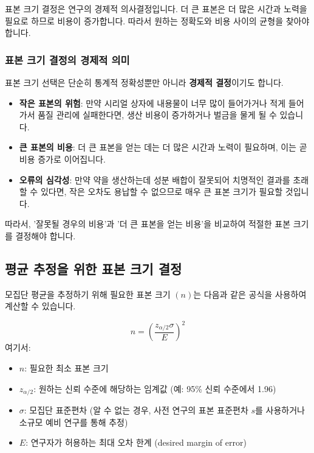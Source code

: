 \documentclass[11pt,a4paper]{article}
\begin{document}
\begin{enumerate}
\begin{enumerate}
\begin{tipbox}
    표본 크기 결정은 연구의 경제적 의사결정입니다. 더 큰 표본은 더 많은 시간과 노력을 필요로 하므로 비용이 증가합니다. 따라서 원하는 정확도와 비용 사이의 균형을 찾아야 합니다.
\end{tipbox}

\subsubsection*{표본 크기 결정의 경제적 의미}
표본 크기 선택은 단순히 통계적 정확성뿐만 아니라 \textbf{경제적 결정}이기도 합니다.
\begin{itemize}
    \item \textbf{작은 표본의 위험}: 만약 시리얼 상자에 내용물이 너무 많이 들어가거나 적게 들어가서 품질 관리에 실패한다면, 생산 비용이 증가하거나 벌금을 물게 될 수 있습니다.
    \item \textbf{큰 표본의 비용}: 더 큰 표본을 얻는 데는 더 많은 시간과 노력이 필요하며, 이는 곧 비용 증가로 이어집니다.
    \item \textbf{오류의 심각성}: 만약 약을 생산하는데 성분 배합이 잘못되어 치명적인 결과를 초래할 수 있다면, 작은 오차도 용납할 수 없으므로 매우 큰 표본 크기가 필요할 것입니다.
\end{itemize}
따라서, '잘못될 경우의 비용'과 '더 큰 표본을 얻는 비용'을 비교하여 적절한 표본 크기를 결정해야 합니다.

\subsection*{평균 추정을 위한 표본 크기 결정}
모집단 평균을 추정하기 위해 필요한 표본 크기 \((n)\)는 다음과 같은 공식을 사용하여 계산할 수 있습니다.

\begin{equation*}
    n = \left( \frac{z_{\alpha/2} \sigma}{E} \right)^2
\end{equation*}
여기서:
\begin{itemize}
    \item \(n\): 필요한 최소 표본 크기
    \item \(z_{\alpha/2}\): 원하는 신뢰 수준에 해당하는 임계값 (예: 95\% 신뢰 수준에서 1.96)
    \item \(\sigma\): 모집단 표준편차 (알 수 없는 경우, 사전 연구의 표본 표준편차 \(s\)를 사용하거나 소규모 예비 연구를 통해 추정)
    \item \(E\): 연구자가 허용하는 최대 오차 한계 (desired margin of error)
\end{itemize}


\end{enumerate}
\end{enumerate}
\end{document}
